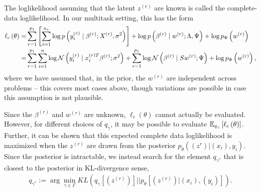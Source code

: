 \documentclass{article}
\begin{document}
The loglikelihood assuming that the latent $z^{(r)}$ are known is called the
complete-data loglikelihood. In our multitask setting, this has the form
\begin{align*}
  \ell_{c}\left(\theta\right) = &\sum_{r = 1}^{p_{1}}\left[\sum_{i = 1}^{n_{r}} \log p\left(y_{i}^{(r)} \mid \beta^{(r)} ; X^{(r)}, \sigma^{2}\right)\right] + \log p\left(\beta^{(r)} \mid w^{(r)}; \Lambda, \Psi\right) + \log p_{\Phi}\left(w^{(r)}\right) \\
  = &\sum_{r = 1}^{p_{1}}\sum_{i = 1}^{n} \log \mathcal{N}\left(y_{i}^{(r)} \mid x_{i}^{(r) T}\beta^{(r)}; \sigma^{2}\right) + \sum_{r = 1}^{p_{1}}\log \mathcal{N}\left(\beta^{(r)} \mid S w^{(r)}; \Psi\right) + \log p_{\Phi}\left(w^{(r)}\right),
\end{align*}
where we have assumed that, in the prior, the $w^{(r)}$ are independent across
problems -- this covers most cases above, though variations are possible in case
this assumption is not plausible.

Since the $\beta^{(r)}$ and $w^{(r)}$ are unknown, $\ell_{c}\left(\theta\right)$
cannot actually be evaluated. However, for different choices of $q_{\gamma}$, it
may be possible to evaluate $\mathbb{E}_{q_{\gamma}}\left[{\ell_{c}\left(\theta\right)}\right]$.
Further, it can be shown that this expected complete data loglikelihood is
maximized when the $z^{(r)}$ are drawn from the posterior
$p_{\theta}\left(\left(z^{r}\right) \vert \left(x_{i}\right), y_{i}\right)$.
Since the posterior is intractable, we instead search for the element
$q_{\gamma^{\ast}}$ that is closest to the posterior in KL-divergence sense,
\begin{align*}
q_{\gamma^{\ast}}:= \arg\min_{\gamma \in \Gamma} KL\left(q_{\gamma}\left[\left(z^{(r)}\right)\right] \vert \vert
p_{\theta}\left[\left(z^{(r)}\right) \vert \left(x_{i}\right), \left(y_{i}\right)\right]\right).
\end{align*}
\end{document}
